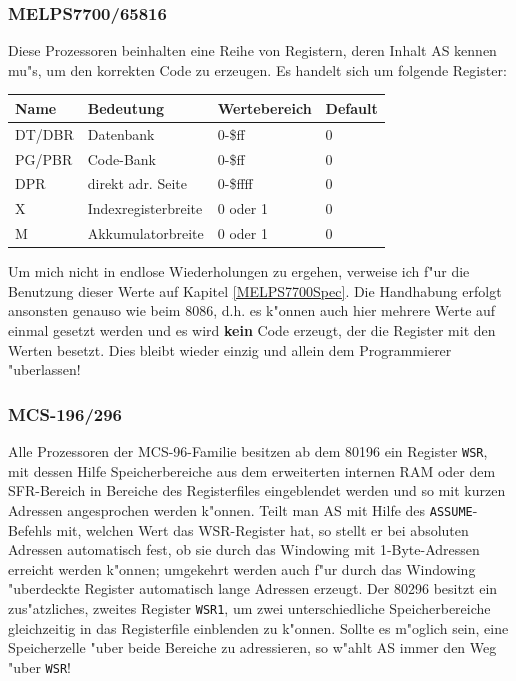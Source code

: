 \documentclass[12pt,a4paper,twoside]{report}
\newcommand{\bb}[1]{{\bf #1}}
\newcommand{\tty}[1]{{\tt #1}}
\newcommand{\asname}{AS}
\begin{document}

\subsubsection{MELPS7700/65816}

Diese Prozessoren beinhalten eine Reihe von Registern, deren Inhalt \asname{}
kennen mu"s, um den korrekten Code zu erzeugen.  Es handelt sich um folgende
Register:
\begin{center}\begin{tabular}{|l|l|l|l|}
\hline
Name  & Bedeutung           & Wertebereich & Default\\
\hline
\hline
DT/DBR & Datenbank           & 0-\$ff       & 0 \\
PG/PBR & Code-Bank           & 0-\$ff       & 0 \\
DPR   & direkt adr. Seite   & 0-\$ffff     & 0 \\
X     & Indexregisterbreite & 0 oder 1     & 0 \\
M     & Akkumulatorbreite   & 0 oder 1     & 0 \\
\hline
\end{tabular}\end{center}
\par
Um mich nicht in endlose Wiederholungen zu ergehen, verweise ich f"ur die
Benutzung dieser Werte auf Kapitel \ref{MELPS7700Spec}.  Die Handhabung
erfolgt ansonsten genauso wie beim 8086, d.h. es k"onnen auch hier mehrere
Werte auf einmal gesetzt werden und es wird \bb{kein} Code erzeugt, der
die Register mit den Werten besetzt.  Dies bleibt wieder einzig und allein
dem Programmierer "uberlassen!


\subsubsection{MCS-196/296}

Alle Prozessoren der MCS-96-Familie besitzen ab dem 80196 ein Register \tty{WSR},
mit dessen Hilfe Speicherbereiche aus dem erweiterten internen RAM
oder dem SFR-Bereich in Bereiche des Registerfiles eingeblendet werden
und so mit kurzen Adressen angesprochen werden k"onnen.  Teilt man \asname{}
mit Hilfe des \tty{ASSUME}-Befehls mit, welchen Wert das WSR-Register
hat, so stellt er bei absoluten Adressen automatisch fest, ob  sie
durch das Windowing mit 1-Byte-Adressen erreicht werden k"onnen;
umgekehrt werden auch f"ur durch das Windowing "uberdeckte Register
automatisch lange Adressen erzeugt.  Der 80296 besitzt ein zus"atzliches,
zweites Register \tty{WSR1}, um zwei unterschiedliche Speicherbereiche
gleichzeitig in das Registerfile einblenden zu k"onnen.  Sollte
es m"oglich sein, eine Speicherzelle "uber beide Bereiche zu adressieren,
so w"ahlt \asname{} immer den Weg "uber \tty{WSR}!
\end{document}
